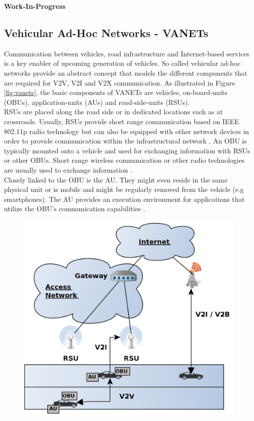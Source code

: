 \documentclass{llncs}
\begin{document}
{			\textbf{Work-In-Progress}
			

		
		\subsection{Vehicular Ad-Hoc Networks - VANETs}
			\label{ss:vanets}

			Communication between vehicles, road infrastructure and Internet-based services is a key enabler of upcoming generation of vehicles. So called vehicular ad-hoc networks provide an abstract concept that models the different components that are required for V2V, V2I and V2X communication. As illustrated in Figure \ref{fig:vanets}, the basic components of VANETs are vehicles, on-board-units (OBUs), application-units (AUs) and road-side-units (RSUs).\\
			RSUs are placed  along the road side or in dedicated locations such as at crossroads. Usually, RSUs provide short range communication based on IEEE 802.11p radio technology but can also be equipped with other network devices in order to provide communication within the infrastructural network \cite{al2014comprehensive}. An OBU is typically mounted onto a vehicle and used for exchanging information with RSUs or other OBUs. Short range wireless communication or other radio technologies are usually used to exchange information \cite{baldessari2007car}.\\
			Closely linked to the OBU is the AU. They might even reside in the same physical unit or is mobile and might be regularly removed from the vehicle (e.g smartphones). The AU provides an execution environment for applications that utilize the OBU's communication capabilities \cite{al2014comprehensive}\cite{baldessari2007car}.\\	
			\begin{figure}[ht]
				\centering
				\includegraphics[scale=0.2]{Figures/Vanets.png}

\end{figure}}
\end{document}
